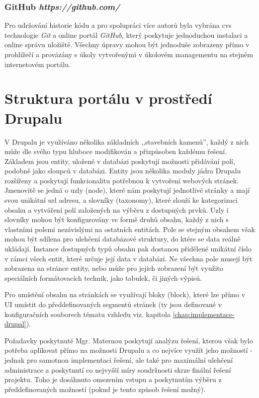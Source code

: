 \subsubsection*{\textbf{GitHub} \hfill \emph{https://github.com/}}
\label{subsec:github}
Pro udržování historie kódu a pro spolupráci více autorů byla vybrána \gls{cvs} technologie \emph{Git} a online portál \emph{GitHub}, který poskytuje jednoduchou instalaci a online správu uložiště. Všechny úpravy mohou být jednoduše zobrazeny přímo v prohlížečí a provázány s úkoly vytvořenými v úkolovém managementu na stejném internetovém portálu. 

\section{Struktura portálu v prostředí Drupalu}

V Drupalu je využíváno několika základních ,,stavebních kamenů'', každý z nich může dle svého typu hluboce modifikován a přizpůsoben každému řešení. Základem jsou entity, uložené v databázi poskytují možnosti přidávání polí, podobně jako sloupců v databázi. Entity jsou několika moduly jádra Drupalu rozšířeny a poskytují funkcionalitu potřebnou k vytvoření webových stránek. Jmenovitě se jedná o uzly (node), které nám poskytují jednotlivé stránky a mají svou unikátní url adresu, a slovníky (taxonomy), které slouží ke kategorizaci obsahu a vytváření polí založených na výběru z dostupných prvků. Uzly i slovníky mohou být konfigurovány ve formě druhů obsahu, každý z nich s vlastními polemi nezávislými na ostatních entitách. Pole se stejným obsahem však mohou být sdílena pro ulehčení databázové struktury, do ktére se data reálně ukládají. Instance dostupných typů obsahu pak dostanou přidělené unikátní číslo v rámci všech entit, které určuje její data v databázi. Ne všechna pole musejí být zobrazena na stránce entity, nebo může pro jejich zobrazení být využito speciálních formátovacích technik, jako tabulek, či jiných výpisů.

Pro umístění obsahu na stránkách se využívají bloky (block), které lze přímo v UI umístit do předdefinovaných segmentů stránek (ty jsou definované v konfiguračních souborech tématu vzhledu viz. kapitola \ref{chap:implementace-drupal}).

Požadavky \cite{omaterna2013} poskytnuté Mgr. Maternou poskytují analýzu řešení, kterou však bylo potřeba aplikovat přímo na možnosti Drupalu a co nejvíce využít jeho možností - jednak pro samotnou implementaci řešení, ale také pro maximální ulehčení administrace a poskytnutí co nejvyšší míry soudržnosti skrze finální řešení projektu. Toho je dosáhnuto omezením vstupu a poskytnutím výběru z předdefinovaných možností (pokud je tento způsob řešení možný).

